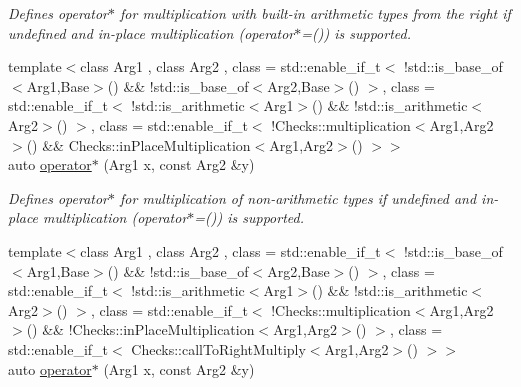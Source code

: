 \begin{DoxyCompactItemize}
\begin{DoxyCompactList}\small\item\em Defines operator$\ast$ for multiplication with built-\/in arithmetic types from the right if undefined and in-\/place multiplication (operator$\ast$=()) is supported. \end{DoxyCompactList}\item 
\hypertarget{namespaceFunG_ad023f2d2273af693f2b4ebceeb296dc8}{{\footnotesize template$<$class Arg1 , class Arg2 , class  = std\-::enable\-\_\-if\-\_\-t$<$ !std\-::is\-\_\-base\-\_\-of$<$\-Arg1,\-Base$>$() \&\& !std\-::is\-\_\-base\-\_\-of$<$\-Arg2,\-Base$>$() $>$, class  = std\-::enable\-\_\-if\-\_\-t$<$ !std\-::is\-\_\-arithmetic$<$\-Arg1$>$() \&\& !std\-::is\-\_\-arithmetic$<$\-Arg2$>$() $>$, class  = std\-::enable\-\_\-if\-\_\-t$<$ !\-Checks\-::multiplication$<$\-Arg1,\-Arg2$>$() \&\&                                       Checks\-::in\-Place\-Multiplication$<$\-Arg1,\-Arg2$>$() $>$$>$ }\\auto \hyperlink{namespaceFunG_ad023f2d2273af693f2b4ebceeb296dc8}{operator$\ast$} (Arg1 x, const Arg2 \&y)}\label{namespaceFunG_ad023f2d2273af693f2b4ebceeb296dc8}

\begin{DoxyCompactList}\small\item\em Defines operator$\ast$ for multiplication of non-\/arithmetic types if undefined and in-\/place multiplication (operator$\ast$=()) is supported. \end{DoxyCompactList}\item 
\hypertarget{namespaceFunG_a6e4d3266e119cd102800bf5c091e57fd}{{\footnotesize template$<$class Arg1 , class Arg2 , class  = std\-::enable\-\_\-if\-\_\-t$<$ !std\-::is\-\_\-base\-\_\-of$<$\-Arg1,\-Base$>$() \&\& !std\-::is\-\_\-base\-\_\-of$<$\-Arg2,\-Base$>$() $>$, class  = std\-::enable\-\_\-if\-\_\-t$<$ !std\-::is\-\_\-arithmetic$<$\-Arg1$>$() \&\& !std\-::is\-\_\-arithmetic$<$\-Arg2$>$() $>$, class  = std\-::enable\-\_\-if\-\_\-t$<$ !\-Checks\-::multiplication$<$\-Arg1,\-Arg2$>$() \&\&                                       !\-Checks\-::in\-Place\-Multiplication$<$\-Arg1,\-Arg2$>$() $>$, class  = std\-::enable\-\_\-if\-\_\-t$<$ Checks\-::call\-To\-Right\-Multiply$<$\-Arg1,\-Arg2$>$() $>$$>$ }\\auto \hyperlink{namespaceFunG_a6e4d3266e119cd102800bf5c091e57fd}{operator$\ast$} (Arg1 x, const Arg2 \&y)}\label{namespaceFunG_a6e4d3266e119cd102800bf5c091e57fd}


\end{DoxyCompactItemize}
